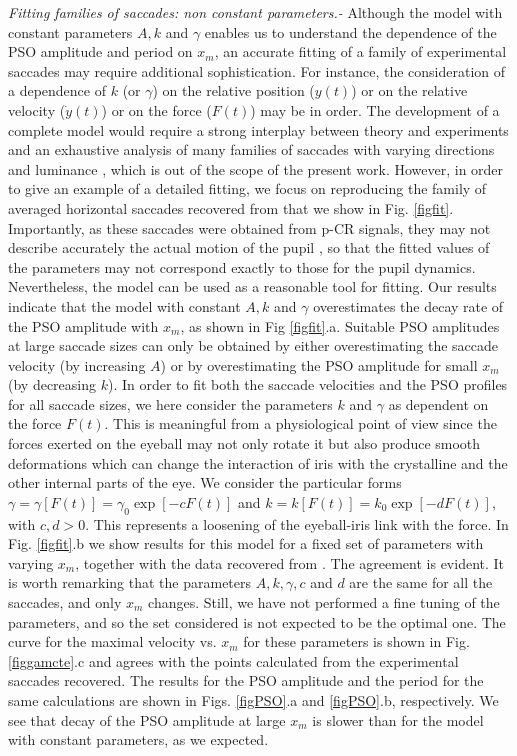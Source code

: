 \documentclass[prl]{revtex4}
\begin{document}
{\em Fitting families of saccades: non constant parameters.-}
Although the model with constant parameters 
$A, k$ and $\gamma$ enables us to understand the dependence of the PSO amplitude and period on $x_m$, an accurate fitting of a family of experimental saccades may require additional sophistication. For instance, the consideration of a dependence of $k$ (or $\gamma$) on the relative position ($y(t)$) or on the relative velocity ($\dot{y}(t)$) or on the force ($F(t)$) may be in order. The development of a complete model would require a strong interplay between theory and experiments and an exhaustive analysis of many families of saccades with varying directions and luminance \cite{nyst2016A}, which is out of the scope of the present work. However, in order to give an example of a detailed fitting, we focus on reproducing the family of averaged horizontal saccades recovered from \cite{holm} that we show in Fig. \ref{figfit}. Importantly, as these saccades were obtained from p-CR signals, they may not describe accurately the actual motion of the pupil \cite{holm2016,supmat}, so that the fitted values of the parameters may not correspond exactly to those for the pupil dynamics. Nevertheless, the model can be used as a reasonable tool for fitting. Our results indicate that the model with constant $A, k$ and $\gamma$  overestimates the decay rate of the PSO amplitude with $x_m$, as shown in Fig  \ref{figfit}.a. Suitable PSO amplitudes at large saccade sizes can only be obtained by either overestimating the saccade velocity (by increasing $A$) or by overestimating the PSO amplitude for small $x_m$ (by decreasing $k$). In order to fit both the saccade velocities and the PSO profiles for all saccade sizes, we here consider the parameters $k$ and $\gamma$ as dependent on the force $F(t)$. This is meaningful from a physiological point of view since the forces exerted on the eyeball may not only rotate it but also produce smooth deformations which can change the interaction of iris with the crystalline and the other internal parts of the eye. We consider the particular forms $\gamma=\gamma[F(t)]=\gamma_0 \exp[-c F(t)]$ and $k=k[F(t)]=k_0 \exp[-d F(t)]$, with $c,d>0$. This represents a loosening of the eyeball-iris link with the force. In Fig. \ref{figfit}.b we show results for this model for a fixed set of parameters with varying $x_m$, together with the data recovered from \cite{holm}. The agreement is evident. It is worth remarking that the parameters $A, k, \gamma, c$ and $d$ are the same for all the saccades, and only $x_m$ changes. Still, we have not performed a fine tuning of the parameters, and so  the set considered is not expected to be the optimal one. The curve for the maximal velocity vs. $x_m$ for these parameters is shown in Fig. \ref{figgamcte}.c and agrees with the points calculated from the experimental saccades recovered. The results for the PSO amplitude and the period for the same calculations are shown in Figs. \ref{figPSO}.a and \ref{figPSO}.b, respectively. We see that decay of the PSO amplitude at large $x_m$ is slower than for the model with constant parameters, as we expected. 
\end{document}
